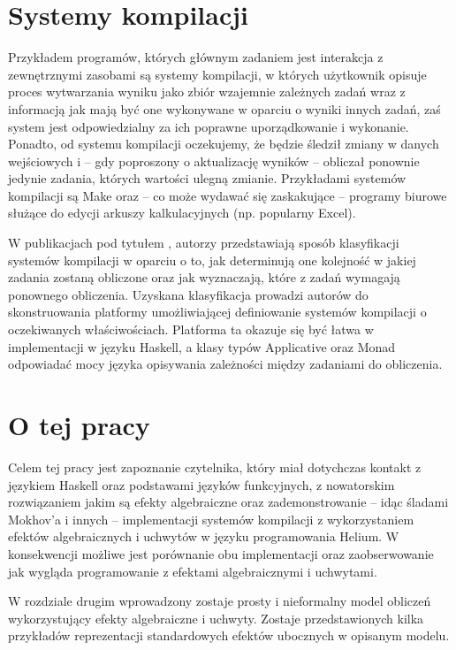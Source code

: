 \section{Systemy kompilacji}

Przykładem programów, których głównym zadaniem jest interakcja z zewnętrznymi zasobami są systemy kompilacji, w których użytkownik opisuje proces wytwarzania wyniku jako zbiór wzajemnie zależnych zadań wraz z informacją jak mają być one wykonywane w oparciu o wyniki innych zadań, zaś system jest odpowiedzialny za ich poprawne uporządkowanie i wykonanie. Ponadto, od systemu kompilacji oczekujemy, że będzie śledził zmiany w danych wejściowych i -- gdy poproszony o aktualizację wyników -- obliczał ponownie jedynie zadania, których wartości ulegną zmianie. Przykładami systemów kompilacji są Make oraz -- co może wydawać się zaskakujące -- programy biurowe służące do edycji arkuszy kalkulacyjnych (np. popularny Excel).

W publikacjach pod tytułem \BSaLC{} \cite{mokhov2018build, mokhov2020build}, autorzy przedstawiają sposób klasyfikacji systemów kompilacji w oparciu o to, jak determinują one kolejność w jakiej zadania zostaną obliczone oraz jak wyznaczają, które z zadań wymagają ponownego obliczenia. Uzyskana klasyfikacja prowadzi autorów do skonstruowania platformy umożliwiającej definiowanie systemów kompilacji o oczekiwanych właściwościach. Platforma ta okazuje się być łatwa w implementacji w języku Haskell, a klasy typów Applicative oraz Monad odpowiadać mocy języka opisywania zależności między zadaniami do obliczenia.

\section{O tej pracy}

Celem tej pracy jest zapoznanie czytelnika, który miał dotychczas kontakt z językiem Haskell oraz podstawami języków funkcyjnych, z nowatorskim rozwiązaniem jakim są efekty algebraiczne oraz zademonstrowanie -- idąc śladami Mokhov'a i innych -- implementacji systemów kompilacji z wykorzystaniem efektów algebraicznych i uchwytów w języku programowania Helium. W konsekwencji możliwe jest porównanie obu implementacji oraz zaobserwowanie jak wygląda programowanie z efektami algebraicznymi i uchwytami.

W rozdziale drugim wprowadzony zostaje prosty i nieformalny model obliczeń wykorzystujący efekty algebraiczne i uchwyty. Zostaje przedstawionych kilka przykładów reprezentacji standardowych efektów ubocznych w opisanym modelu.

